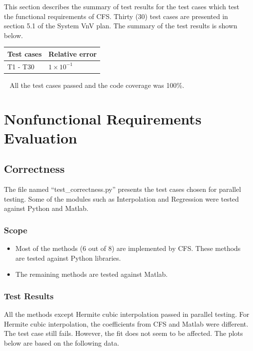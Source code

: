 \documentclass[12pt, titlepage]{article}
\newcommand{\famname}{CFS}
\begin{document}
This section describes the summary of test results for the test cases 
which 
test the functional requirements of \famname{}. Thirty ($30$) test cases 
are 
presented in section 5.1 of the System VnV plan. The summary of the test 
results is shown below.
~\newline
~\newline
\begin{tabularx}{\textwidth}{p{4cm}p{4cm}}
	\toprule {\bf Test cases} & {\bf Relative error}\\
	\midrule
	T1 - T30 & $1 \times 10^{-1}$ \\
	\bottomrule
\end{tabularx}
~\newline
\noindent All the test cases passed and the code coverage was 100\%.



\section{Nonfunctional Requirements Evaluation}

\subsection{Correctness}

The file named ``test\_correctness.py'' presents the test cases chosen 
for parallel testing. Some of the modules such as Interpolation and 
Regression 
were tested against Python and Matlab. 

\subsubsection{Scope}

\begin{itemize}
	\item Most of the methods ($6$ out of $8$) are implemented by 
	\famname{}. 
	These methods are tested against Python libraries.
	\item The remaining methods are tested against Matlab.
\end{itemize}

\subsubsection{Test Results}

All the methods except Hermite cubic interpolation passed in parallel 
testing. 
For Hermite cubic interpolation, the coefficients from \famname{} and 
Matlab 
were different. The test case still fails. However, the fit does not seem 
to be 
affected. The plots below are based on the following data. \\
\end{document}
